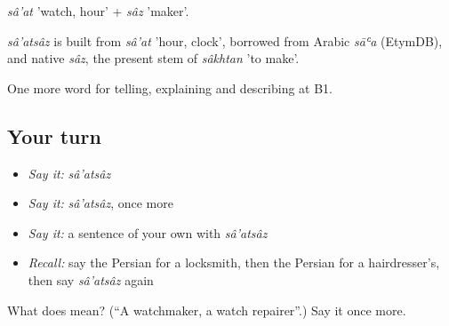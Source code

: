 \emph{sâ'at} 'watch, hour' + \emph{sâz} 'maker'.

\begin{cousinweb}
\emph{sâ'atsâz} is built from \emph{sâ'at} 'hour, clock', borrowed from Arabic \emph{sāʿa} (EtymDB), and native \emph{sâz}, the present stem of \emph{sâkhtan} 'to make'.
\end{cousinweb}

\begin{grammarlens}[title={What you've built}]
One more word for telling, explaining and describing at B1.
\end{grammarlens}

\subsection*{Your turn}
\begin{itemize}
\raggedright
  \item \emph{Say it:} \emph{sâ'atsâz}
  \item \emph{Say it:} \emph{sâ'atsâz}, once more
  \item \emph{Say it:} a sentence of your own with \emph{sâ'atsâz}
  \item \emph{Recall:} say the Persian for a locksmith, then the Persian for a hairdresser's, then say \emph{sâ'atsâz} again
\end{itemize}

\begin{tcolorbox}[breakable,colback=teal!4,colframe=teal!35!black,title={Before you move on}]
What does   mean? (\textquotedblleft{}A watchmaker, a watch repairer\textquotedblright{}.) Say it once more.
\end{tcolorbox}
